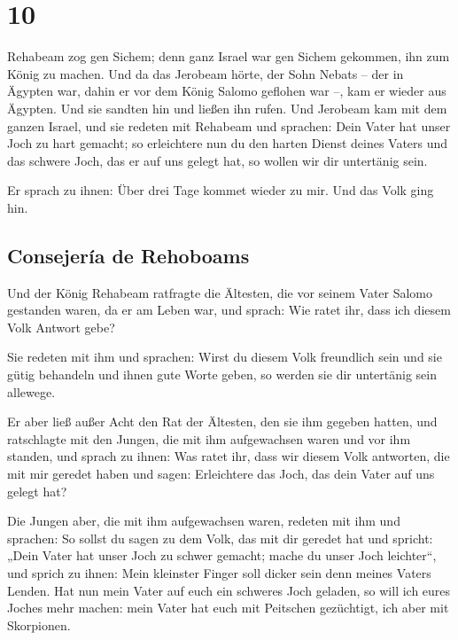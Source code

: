 \hypertarget{section-9}{%
\section{10}\label{section-9}}

 Rehabeam zog gen Sichem; denn ganz Israel war gen Sichem
gekommen, ihn zum König zu machen.  Und da das Jerobeam
hörte, der Sohn Nebats -- der in Ägypten war, dahin er vor dem König
Salomo geflohen war --, kam er wieder aus Ägypten.  Und
sie sandten hin und ließen ihn rufen. Und Jerobeam kam mit dem ganzen
Israel, und sie redeten mit Rehabeam und sprachen:  Dein
Vater hat unser Joch zu hart gemacht; so erleichtere nun du den harten
Dienst deines Vaters und das schwere Joch, das er auf uns gelegt hat, so
wollen wir dir untertänig sein.

 Er sprach zu ihnen: Über drei Tage kommet wieder zu mir.
Und das Volk ging hin.

\hypertarget{consejeruxeda-de-rehoboams}{%
\subsection{Consejería de Rehoboams}\label{consejeruxeda-de-rehoboams}}

 Und der König Rehabeam ratfragte die Ältesten, die vor
seinem Vater Salomo gestanden waren, da er am Leben war, und sprach: Wie
ratet ihr, dass ich diesem Volk Antwort gebe?

 Sie redeten mit ihm und sprachen: Wirst du diesem Volk
freundlich sein und sie gütig behandeln und ihnen gute Worte geben, so
werden sie dir untertänig sein allewege.

 Er aber ließ außer Acht den Rat der Ältesten, den sie ihm
gegeben hatten, und ratschlagte mit den Jungen, die mit ihm aufgewachsen
waren und vor ihm standen,  und sprach zu ihnen: Was ratet
ihr, dass wir diesem Volk antworten, die mit mir geredet haben und
sagen: Erleichtere das Joch, das dein Vater auf uns gelegt hat?

 Die Jungen aber, die mit ihm aufgewachsen waren, redeten
mit ihm und sprachen: So sollst du sagen zu dem Volk, das mit dir
geredet hat und spricht: „Dein Vater hat unser Joch zu schwer gemacht;
mache du unser Joch leichter``, und sprich zu ihnen: Mein kleinster
Finger soll dicker sein denn meines Vaters Lenden.  Hat
nun mein Vater auf euch ein schweres Joch geladen, so will ich eures
Joches mehr machen: mein Vater hat euch mit Peitschen gezüchtigt, ich
aber mit Skorpionen.


